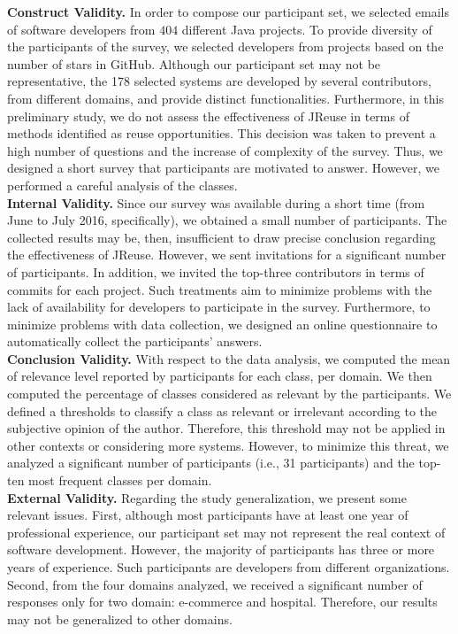 \noindent
\textbf{Construct Validity.}  
In order to compose our participant set, we selected emails of software developers from $404$ different Java projects. To provide diversity of the participants of the survey, we selected developers from projects based on the number of stars in GitHub. Although our participant set may not be representative, the 178 selected systems are developed by several contributors, from different domains, and provide distinct functionalities. Furthermore, in this preliminary study, we do not assess the effectiveness of JReuse in terms of methods identified as reuse opportunities. This decision was taken to prevent a high number of questions and the increase of complexity of the survey. Thus, we designed a short survey that participants are motivated to answer. However, we performed a careful analysis of the classes.\\

\noindent
\textbf{Internal Validity.}  
Since our survey was available during a short time (from June to July 2016, specifically), we obtained a small number of participants. The collected results may be, then, insufficient to draw precise conclusion regarding the effectiveness of JReuse. However, we sent invitations for a significant number of participants. In addition, we invited the top-three contributors in terms of commits for each project. Such treatments aim to minimize problems with the lack of availability for developers to participate in the survey. Furthermore, to minimize problems with data collection, we designed an online questionnaire to automatically collect the participants' answers.\\

\noindent
\textbf{Conclusion Validity.} With respect to the data analysis, we computed the mean of relevance level reported by participants for each class, per domain. We then computed the percentage of classes considered as relevant by the participants. We defined a thresholds to classify a class as relevant or irrelevant according to the subjective opinion of the author. Therefore, this threshold may not be applied in other contexts or considering more systems. However, to minimize this threat, we analyzed a significant number of participants (i.e., 31 participants) and the top-ten most frequent classes per domain.\\

\noindent
\textbf{External Validity.} 
Regarding the study generalization, we present some relevant issues. First, although most  participants have at least one year of professional experience, our participant set may not represent the real context of software development. However, the majority of participants has three or more years of experience. Such participants are developers from different organizations. Second, from the four domains analyzed, we received  a significant number of responses only for two domain: e-commerce and hospital. Therefore, our results may not be generalized to other domains.




